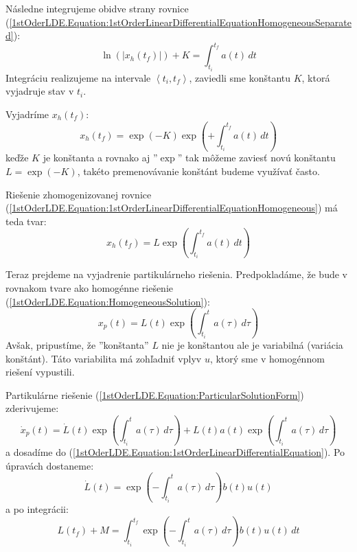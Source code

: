 \documentclass[a4paper, 10pt, ]{article}
\begin{document}
\noindent Následne integrujeme obidve strany rovnice (\ref{1stOderLDE.Equation:1stOrderLinearDifferentialEquationHomogeneousSeparated}):
\begin{equation}
    \label{1stOrderLDE.Equation:HomogeneousIntegral}
    \ln \left( |x_h(t_f)| \right) + K = \int_{t_i}^{t_f} a(t) \, dt
\end{equation}
Integráciu realizujeme na intervale $\left< t_i, t_f \right>$, zaviedli sme konštantu $K$, ktorá vyjadruje stav v $t_i$.

Vyjadríme $x_h(t_f)$:
\begin{equation}
    x_h(t_f) = \exp(-K) \exp \left( + \int_{t_i}^{t_f} a(t) \, dt \right)
\end{equation}
keďže $K$ je konštanta a rovnako aj ''$\exp$'' tak môžeme zaviesť novú konštantu $L = \exp(-K)$, takéto premenovávanie konštánt budeme využívať často.

Riešenie zhomogenizovanej rovnice (\ref{1stOderLDE.Equation:1stOrderLinearDifferentialEquationHomogeneous}) má teda tvar:
\begin{equation}
    \label{1stOderLDE.Equation:HomogeneousSolution}
    x_h(t_f) = L \exp \left( \int_{t_i}^{t_f} a(t) \, dt \right)
\end{equation}

Teraz prejdeme na vyjadrenie partikulárneho riešenia. Predpokladáme, že bude v rovnakom tvare ako homogénne riešenie (\ref{1stOderLDE.Equation:HomogeneousSolution}):
\begin{equation}
    \label{1stOderLDE.Equation:ParticularSolutionForm}
    x_p(t) = L(t) \exp \left( \int_{t_i}^{t} a(\tau) \, d\tau \right)
\end{equation}
Avšak, pripustíme, že ''konštanta'' $L$ nie je konštantou ale je variabilná (variácia konštánt). Táto variabilita má zohľadniť vplyv $u$, ktorý sme v homogénnom riešení vypustili.

Partikulárne riešenie (\ref{1stOderLDE.Equation:ParticularSolutionForm}) zderivujeme:
\begin{equation}
    \dot{x}_p(t) = 
    \dot{L}(t) \exp \left( \int_{t_i}^{t} a(\tau) \, d\tau \right) + 
    L(t) a(t) \exp \left( \int_{t_i}^{t} a(\tau) \, d\tau \right)
\end{equation}
a dosadíme do (\ref{1stOderLDE.Equation:1stOrderLinearDifferentialEquation}). Po úpravách dostaneme:
\begin{equation}
    \dot{L}(t)  = 
    \exp \left( -\int_{t_i}^{t} a(\tau) \, d\tau \right) b(t) u(t)
\end{equation}
a po integrácii:
\begin{equation}
    \label{1stOderLDE.Equation:ConstantVariation}
    L(t_f) + M = \int_{t_i}^{t_f} \exp \left( -\int_{t_i}^{t} a(\tau) \, d\tau \right) b(t) u(t) \, dt
\end{equation}
\end{document}
